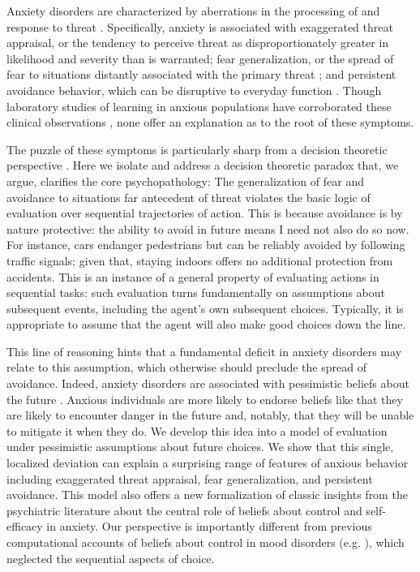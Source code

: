\documentclass[11pt]{article} %
\begin{document}
Anxiety disorders are characterized by aberrations in the processing of and response to threat \citep{dsm5, ClarkBeck2011}. Specifically, anxiety is associated with exaggerated threat appraisal, or the tendency to perceive threat as disproportionately greater in likelihood and severity than is warranted; fear generalization, or the spread of fear to situations distantly associated with the primary threat \citep{dymond2015}; and persistent avoidance behavior, which can be disruptive to everyday function \citep{Arnaudova2017}. Though laboratory studies of learning in anxious populations have corroborated these clinical observations \citep{Harle2017, norbury2018, Aylward2019}, none offer an explanation as to the root of these symptoms.

The puzzle of these symptoms is particularly sharp from a decision theoretic perspective \citep{huys2015}. Here we isolate and address a  decision theoretic paradox that, we argue, clarifies the core psychopathology: The generalization of fear and avoidance to situations far antecedent of threat violates the basic logic of evaluation over sequential trajectories of action. This is because avoidance is by nature protective: the ability to avoid in future means I need not also do so now. For instance, cars endanger pedestrians but can be reliably avoided by following traffic signals; given that, staying indoors offers no additional protection from accidents. This is an instance of a general property of evaluating actions in sequential tasks: such evaluation turns fundamentally on assumptions about subsequent events, including the agent's own subsequent choices. Typically, it is appropriate to assume that the agent will also make good choices down the line.

This line of reasoning hints that a fundamental deficit in anxiety disorders may relate to this assumption, which otherwise should preclude the spread of avoidance. Indeed, anxiety disorders are associated with pessimistic beliefs about the future \citep{ClarkBeck2011}. Anxious individuals are more likely to endorse beliefs like that they are likely to encounter danger in the future and, notably, that they will be unable to mitigate it when they do. We develop this idea into a model of evaluation under pessimistic assumptions about future choices. We show that this single, localized deviation can explain a surprising range of features of anxious behavior including exaggerated threat appraisal, fear generalization, and persistent avoidance. This model also offers a new formalization of classic insights from the psychiatric literature about the central role of beliefs about control and self-efficacy in anxiety. Our perspective is importantly different from previous computational accounts of beliefs about control in mood disorders (e.g. \cite{HuysDayan2009}), which neglected the sequential aspects of choice.
\end{document}
